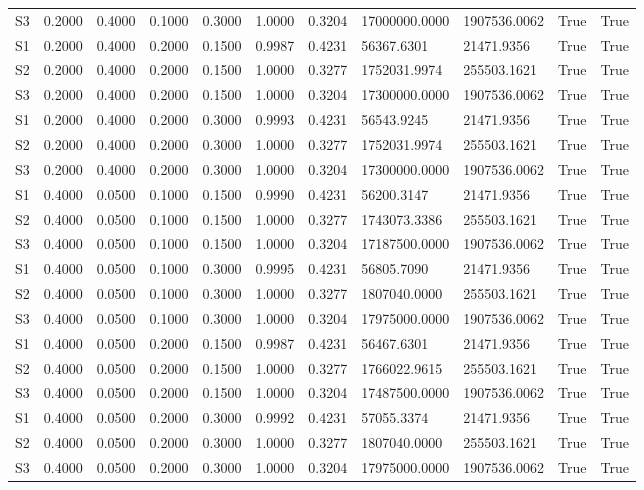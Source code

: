\documentclass[11pt,a4paper]{article}
\begin{document}
\begin{landscape}
{\begin{longtable}{lllllllllll}
S3 & 0.2000 & 0.4000 & 0.1000 & 0.3000 & 1.0000 & 0.3204 & 17000000.0000 & 1907536.0062 & True & True \\
S1 & 0.2000 & 0.4000 & 0.2000 & 0.1500 & 0.9987 & 0.4231 & 56367.6301 & 21471.9356 & True & True \\
S2 & 0.2000 & 0.4000 & 0.2000 & 0.1500 & 1.0000 & 0.3277 & 1752031.9974 & 255503.1621 & True & True \\
S3 & 0.2000 & 0.4000 & 0.2000 & 0.1500 & 1.0000 & 0.3204 & 17300000.0000 & 1907536.0062 & True & True \\
S1 & 0.2000 & 0.4000 & 0.2000 & 0.3000 & 0.9993 & 0.4231 & 56543.9245 & 21471.9356 & True & True \\
S2 & 0.2000 & 0.4000 & 0.2000 & 0.3000 & 1.0000 & 0.3277 & 1752031.9974 & 255503.1621 & True & True \\
S3 & 0.2000 & 0.4000 & 0.2000 & 0.3000 & 1.0000 & 0.3204 & 17300000.0000 & 1907536.0062 & True & True \\
S1 & 0.4000 & 0.0500 & 0.1000 & 0.1500 & 0.9990 & 0.4231 & 56200.3147 & 21471.9356 & True & True \\
S2 & 0.4000 & 0.0500 & 0.1000 & 0.1500 & 1.0000 & 0.3277 & 1743073.3386 & 255503.1621 & True & True \\
S3 & 0.4000 & 0.0500 & 0.1000 & 0.1500 & 1.0000 & 0.3204 & 17187500.0000 & 1907536.0062 & True & True \\
S1 & 0.4000 & 0.0500 & 0.1000 & 0.3000 & 0.9995 & 0.4231 & 56805.7090 & 21471.9356 & True & True \\
S2 & 0.4000 & 0.0500 & 0.1000 & 0.3000 & 1.0000 & 0.3277 & 1807040.0000 & 255503.1621 & True & True \\
S3 & 0.4000 & 0.0500 & 0.1000 & 0.3000 & 1.0000 & 0.3204 & 17975000.0000 & 1907536.0062 & True & True \\
S1 & 0.4000 & 0.0500 & 0.2000 & 0.1500 & 0.9987 & 0.4231 & 56467.6301 & 21471.9356 & True & True \\
S2 & 0.4000 & 0.0500 & 0.2000 & 0.1500 & 1.0000 & 0.3277 & 1766022.9615 & 255503.1621 & True & True \\
S3 & 0.4000 & 0.0500 & 0.2000 & 0.1500 & 1.0000 & 0.3204 & 17487500.0000 & 1907536.0062 & True & True \\
S1 & 0.4000 & 0.0500 & 0.2000 & 0.3000 & 0.9992 & 0.4231 & 57055.3374 & 21471.9356 & True & True \\
S2 & 0.4000 & 0.0500 & 0.2000 & 0.3000 & 1.0000 & 0.3277 & 1807040.0000 & 255503.1621 & True & True \\
S3 & 0.4000 & 0.0500 & 0.2000 & 0.3000 & 1.0000 & 0.3204 & 17975000.0000 & 1907536.0062 & True & True \\

\end{longtable}}
\end{landscape}
\end{document}
